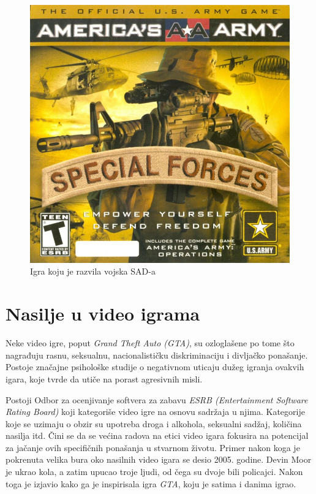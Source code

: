 \documentclass[a4paper]{article}
\begin{document}
\begin{figure}[h!]
	\begin{center}
		\includegraphics[scale=1]{americasarmy.jpg}
	\end{center}
	\caption{Igra koju je razvila vojska SAD-a}
\end{figure}

\newpage

\section{Nasilje u video igrama}
\label{sec:nasilje}
Neke video igre, poput {\em Grand Theft Auto (GTA)}, su ozloglašene po tome što 
nagrađuju rasnu, seksualnu, nacionalističku diskriminaciju i divljačko ponašanje. Postoje 
značajne psihološke studije o negativnom uticaju dužeg igranja ovakvih igara, koje tvrde da utiče na porast
agresivnih misli. 

Postoji Odbor za ocenjivanje softvera za zabavu {\em ESRB (Entertainment Software Rating Board)} koji kategoriše
video igre na osnovu sadržaja u njima. Kategorije koje se uzimaju o obzir su upotreba droga i alkohola, seksualni sadžaj,
količina nasilja itd. Čini se da se većina radova na etici video igara fokusira na potencijal za
jačanje ovih specifičnih ponašanja u stvarnom životu. Primer nakon koga je pokrenuta velika bura oko nasilnih video igara
se desio 2005. godine. Devin Moor je ukrao kola, a zatim upucao troje ljudi, od čega su dvoje bili policajci.
Nakon toga je izjavio kako ga je inspirisala igra {\em GTA}, koju je satima i danima igrao.\cite{cbs_devim_moor}
\end{document}
